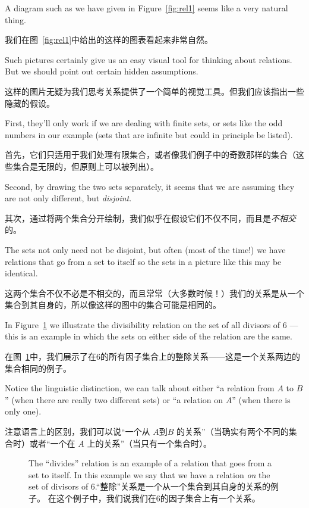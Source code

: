 A diagram such as we have given in Figure~\ref{fig:rel1} seems like a 
very natural thing.

我们在图~\ref{fig:rel1}中给出的这样的图表看起来非常自然。

Such pictures certainly give us an easy visual 
tool for thinking
about relations.  But we should point out certain hidden assumptions.

这样的图片无疑为我们思考关系提供了一个简单的视觉工具。但我们应该指出一些隐藏的假设。

First, they'll only work if we are dealing with finite sets, or sets
like the odd numbers in our example (sets that are infinite but could
in principle be listed).

首先，它们只适用于我们处理有限集合，或者像我们例子中的奇数那样的集合（这些集合是无限的，但原则上可以被列出）。

Second, by drawing the two sets separately,
it seems that we are assuming they are not only different, but 
\emph{disjoint}.

其次，通过将两个集合分开绘制，我们似乎在假设它们不仅不同，而且是\emph{不相交}的。

The sets not only need not be disjoint, but often
(most of the time!) we have relations that go from a set to itself
so the sets in a picture like this may be identical.

这两个集合不仅不必是不相交的，而且常常（大多数时候！）我们的关系是从一个集合到其自身的，所以像这样的图中的集合可能是相同的。

In Figure~\ref{fig:rel2}
we illustrate the divisibility relation on the set of all divisors of
6 --- this is an example in which the sets on either side of the relation
are the same.

在图~\ref{fig:rel2}中，我们展示了在6的所有因子集合上的整除关系——这是一个关系两边的集合相同的例子。

Notice the linguistic distinction, we can talk about
either ``a relation from $A$ to $B$'' (when there are really two 
different sets) or ``a relation on $A$'' (when there is only one).

注意语言上的区别，我们可以说“一个从 $A$到$B$ 的关系”（当确实有两个不同的集合时）或者“一个在 $A$ 上的关系”（当只有一个集合时）。

\begin{figure}[!hbtp]

\caption[An example of the ``divides'' relation.一个“整除”关系的例子。]{The ``divides'' relation %
is an example of a relation that goes from a set to itself.
In this example %
we say that we have a relation \emph{on} the set of divisors of 6.“整除”关系是一个从一个集合到其自身的关系的例子。
在这个例子中，我们说我们在6的因子集合上有一个关系。}
\label{fig:rel2} 
\end{figure}
 
